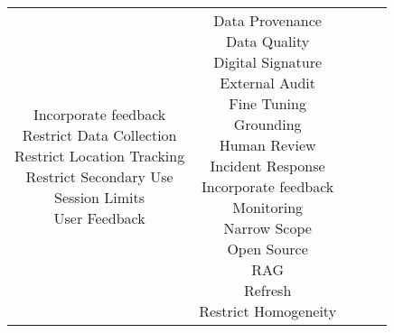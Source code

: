 \documentclass[fleqn]{article}
\begin{document}
\begin{landscape}
\begin{table}[H]
\begin{tabular}{|c|c|c|c|c|}
{			\textbullet\hspace{3pt} Incorporate feedback \\ 
			\textbullet\hspace{3pt} Restrict Data Collection\\ 		
			\textbullet\hspace{3pt} Restrict Location Tracking\\ 	
			\textbullet\hspace{3pt} Restrict Secondary Use\\ 		
			\textbullet\hspace{3pt} Session Limits\\ 	
			\textbullet\hspace{3pt} User Feedback\\ 						 	 
		}
		& \makecell[l]{
			\textbullet\hspace{3pt} Data Provenance\\ 	
			\textbullet\hspace{3pt} Data Quality\\ 	
			\textbullet\hspace{3pt} Digital Signature\\ 	
			\textbullet\hspace{3pt} External Audit\\ 
			\textbullet\hspace{3pt} Fine Tuning\\ 	
			\textbullet\hspace{3pt} Grounding\\ 	
			\textbullet\hspace{3pt} Human Review \\ 	
			\textbullet\hspace{3pt} Incident Response\\ 	
			\textbullet\hspace{3pt} Incorporate feedback \\ 
			\textbullet\hspace{3pt} Monitoring\\ 	
			\textbullet\hspace{3pt} Narrow Scope\\ 	
			\textbullet\hspace{3pt} Open Source\\ 	
			\textbullet\hspace{3pt} RAG\\ 	
			\textbullet\hspace{3pt} Refresh\\ 	
			\textbullet\hspace{3pt} Restrict Homogeneity\\ 			
}
\end{tabular}
\end{table}
\end{landscape}
\end{document}
